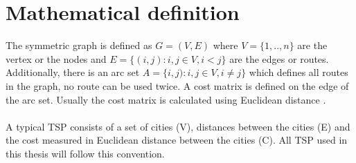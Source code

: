 \section{Mathematical definition}
The symmetric graph is defined as $G=(V,E)$ where $V=\{1,..,n\}$ are the vertex or the nodes and $E=\{(i,j):i,j\in V, i<j\}$ are the edges or routes. Additionally, there is an arc set $A=\{i,j):i,j\in V, i\neq j\}$ which defines all routes in the graph, no route can be used twice. A cost matrix is defined on the edge of the arc set. Usually the cost matrix is calculated using Euclidean distance \cite{Matai10}.\\\\
A typical TSP consists of a set of cities (V), distances between the cities (E) and the cost measured in Euclidean distance between the cities (C). All TSP used in this thesis will follow this convention. 


 



